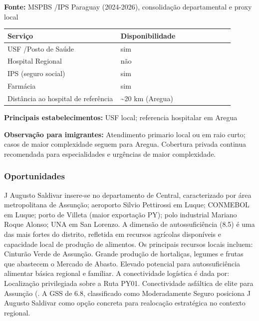 \textbf{Fonte:} MSPBS /\allowbreak  IPS Paraguay (2024-2026), consolidação
departamental e proxy local

{\def\LTcaptype{none} %
\begin{longtable}{@{}>{\raggedright\arraybackslash}p{0.45\linewidth} >{\raggedright\arraybackslash}p{0.45\linewidth}@{}}
\toprule\noalign{}
Serviço & Disponibilidade \\
\midrule\noalign{}
\endhead
\bottomrule\noalign{}
\endlastfoot
USF /\allowbreak  Posto de Saúde & sim \\
Hospital Regional & não \\
IPS (seguro social) & sim \\
Farmácia & sim \\
Distância ao hospital de referência & \textasciitilde20 km (Aregua) \\
\end{longtable}
}

\textbf{Principais estabelecimentos:} USF local; referencia hospitalar
em Aregua

\textbf{Observação para imigrantes:} Atendimento primario local ou em
raio curto; casos de maior complexidade seguem para Aregua. Cobertura
privada continua recomendada para especialidades e urgências de maior
complexidade.
\newpage

\subsubsection*{Oportunidades}\label{oport-j-augusto-saldivar-1119}
J Augusto Saldivar insere-se no departamento de Central, caracterizado por área metropolitana de Assunção; aeroporto Silvio Pettirossi em Luque; CONMEBOL em Luque; porto de Villeta (maior exportação PY); polo industrial Mariano Roque Alonso; UNA em San Lorenzo. A dimensão de autossuficiência (8.5) é uma das mais fortes do distrito, refletida em recursos agrícolas disponíveis e capacidade local de produção de alimentos. Os principais recursos locais incluem: Cinturão Verde de Assunção. Grande produção de hortaliças, legumes e frutas que abastecem o Mercado de Abasto. Elevado potencial para autossuficiência alimentar básica regional e familiar. A conectividade logística é dada por: Localização privilegiada sobre a Ruta PY01. Conectividade asfáltica de elite para Assunção (. A GSS de 6.8, classificado como Moderadamente Seguro posiciona J Augusto Saldivar como opção concreta para realocação estratégica no contexto regional.

